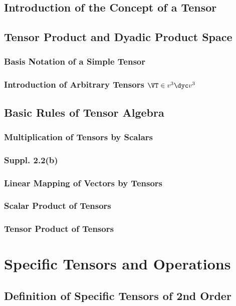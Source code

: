 \documentclass[a5paper,twosided,11pt,DIV=15,BCOR=0mm]{scrbook}
\begin{document}
\subsection{Introduction of the Concept of a Tensor}
\subsection{Tensor Product and Dyadic Product Space}

\subsubsection{Basis Notation of a Simple Tensor}
\subsubsection{Introduction of Arbitrary Tensors $\VT\in v^3 \dyc v^3$}

\subsection{Basic Rules of Tensor Algebra}

\subsubsection{Multiplication of Tensors by Scalars}

\subsubsection{Suppl. 2.2(b)}
\subsubsection{Linear Mapping of Vectors by Tensors}
\subsubsection{Scalar Product of Tensors}
\subsubsection{Tensor Product of Tensors}

\section{Specific Tensors and Operations}

\subsection{Definition of Specific Tensors of 2nd Order}
\end{document}
